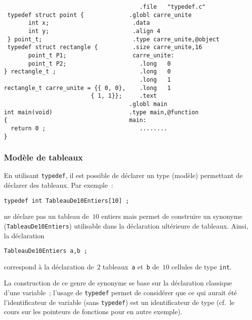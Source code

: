 \begin{frame}[fragile]
\begin{verbatim}
                                       .file   "typedef.c"  
 typedef struct point {             .globl carre_unite                              
       int x;                        .data                                                     
       int y;                        .align 4                                                  
 } point_t;                          .type carre_unite,@object                               
 typedef struct rectangle {          .size carre_unite,16                                    
       point_t P1;                   carre_unite:             
       point_t P2;                     .long   0                                                 
} rectangle_t ;                        .long   0                                                 
                                       .long   1                                                 
rectangle_t carre_unite = {{ 0, 0},    .long   1                                                 
                         { 1, 1}};     .text                                                     
                                    .globl main                                          
int main(void)                      .type main,@function                                    
{                                   main:
  return 0 ;                           ........
}
\end{verbatim}
\end{frame}
\begin{frame}[fragile]
  \frametitle{Mod\`ele de tableaux}
  En utilisant \verb+typedef+, il est possible de d\'eclarer un type
  (mod\`ele) permettant de d\'eclarer des tableaux. 
  Par exemple~:
\begin{verbatim}
typedef int TableauDe10Entiers[10] ;
\end{verbatim}
ne d\'eclare pas un tableau de~$10$ entiers mais permet de construire
un synonyme (\verb+TableauDe10Entiers+) utilisable dans la
d\'eclaration ult\'erieure de tableaux. Ainsi, la d\'eclaration
\begin{verbatim}
TableauDe10Entiers a,b ;
\end{verbatim}
correspond \`a la d\'eclaration de~$2$ tableaux~\verb+a+ et~\verb+b+
de~$10$ cellules de type \verb+int+.
\par\bigskip
La construction de ce genre de synonyme se base sur la d\'eclaration
classique d'une variable~; l'usage de \verb+typedef+ permet de
consid\'erer que ce qui aurait \'et\'e l'identificateur de variable
(sans \verb+typedef+) est un identificateur de type (cf.\ le cours sur
les pointeurs de fonctions pour en autre exemple).
\end{frame}
